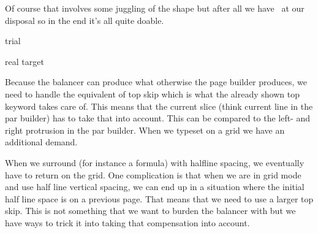 \startlinecorrection
    \small
\stoplinecorrection

Of course that involves some juggling of the shape but after all we have \LUA\ at
our disposal so in the end it's all quite doable.

\startbuffer[three]
\setbox\scratchboxtwo\vbalance\scratchboxone trial
\stopbuffer

\startbuffer[four]
\global\globalscratchtoks\emptytoks
\localcontrolledendless {%
    \ifvoid\scratchboxtwo
        \expandafter\quitloop
    \else
        \setbox\scratchbox\vbalancedbox\scratchboxtwo
        \xtoksapp\globalscratchtoks {
            \NC \the\currentloopiterator
            \NC \the\ht\scratchbox
            \NC \the\balanceshapevsize\currentloopiterator
            \NC \NR
        }
    \fi
}
\stopbuffer

\start
    \small
\stop

\starttabulate[||||]
\BC \BC real \BC target \NC \NR
\the\globalscratchtoks
\stoptabulate

Because the balancer can produce what otherwise the page builder produces, we
need to handle the equivalent of top skip which is what the already shown \type
{top} keyword takes care of. This means that the current slice (think current
line in the par builder) has to take that into account. This can be compared to the
left- and right protrusion in the par builder. When we typeset on a grid we have an
additional demand.

When we surround (for instance a formula) with halfline spacing, we eventually
have to return on the grid. One complication is that when we are in grid mode and
use half line vertical spacing, we can end up in a situation where the initial
half line space is on a previous page. That means that we need to use a larger
top skip. This is not something that we want to burden the balancer with but we
have ways to trick it into taking that compensation into account.

